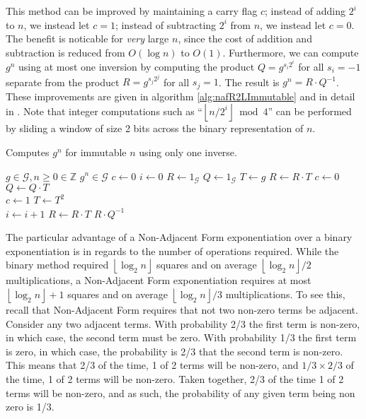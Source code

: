 \documentclass{ucalgthes1}
\theoremstyle{plain}
\theoremstyle{definition}
\newcommand{\ZZ}{\mathbb{Z}}
\newcommand{\floor}[1]{\left\lfloor #1 \right\rfloor}
\begin{document}
This method can be improved by maintaining a carry flag $c$; instead of adding $2^i$ to $n$, we instead let $c = 1$; instead of subtracting $2^i$ from $n$, we instead let $c = 0$.  The benefit is noticable for \emph{very} large $n$, since the cost of addition and subtraction is reduced from $O(\log n)$ to $O(1)$.  Furthermore, we can compute $g^n$ using at most one inversion by computing the product $Q = g^{s_i2^i}$ for all $s_i = -1$ separate from the product $R = g^{s_j2^j}$ for all $s_j = 1$.  The result is $g^n = R \cdot Q^{-1}$.  These improvements are given in algorithm \ref{alg:nafR2LImmutable} and in detail in \cite[p.4]{Joye2000}.  Note that integer computations such as ``$\floor{n/2^i} \bmod 4$'' can be performed by sliding a window of size 2 bits across the binary representation of $n$.

\bigbreak
\begin{algorithm}[h]
\caption{Computes $g^n$ for immutable $n$ using only one inverse.}\label{alg:nafR2LImmutable}
\begin{algorithmic}[1]
\REQUIRE $g \in \mathcal G, n \ge 0 \in \ZZ$
\ENSURE $g^n \in \mathcal G$
\STATE $c \gets 0$ 
\STATE $i \gets 0$
\STATE $R \gets 1_{\mathcal G}$ 
\STATE $Q \gets 1_{\mathcal G}$ 
\STATE $T \gets g$ 
	\IF {$\floor{n/2^i}+c \equiv 1 \pmod 4$}
		\STATE $R \gets R \cdot T$
		\STATE $c \gets 0$
	\ELSIF {$\floor{n/2^i}+c \equiv 3 \pmod 4$}
		\STATE $Q \gets Q \cdot T$ \\
		\STATE $c \gets 1$
	\ENDIF
	\STATE $T \gets T^2$ \\
	\STATE $i \gets i+1$
\ENDWHILE
{} \STATE $R \gets R \cdot T$ \ENDIF
\RETURN $R \cdot Q^{-1}$
\end{algorithmic}
\end{algorithm}

The particular advantage of a Non-Adjacent Form exponentiation over a binary exponentiation is in regards to the number of operations required.  While the binary method required $\floor{\log_2 n}$ squares and on average $\floor{\log_2 n}/2$ multiplications, a Non-Adjacent Form exponentiation requires at most $\floor{\log_2 n}+1$ squares and on average $\floor{\log_2 n}/3$ multiplications.  To see this, recall that Non-Adjacent Form requires that not two non-zero terms be adjacent.  Consider any two adjacent terms.  With probability 2/3 the first term is non-zero, in which case, the second term must be zero.  With probability 1/3 the first term is zero, in which case, the probability is 2/3 that the second term is non-zero.  This means that 2/3 of the time, 1 of 2 terms will be non-zero, and $1/3 \times 2/3$ of the time, 1 of 2 terms will be non-zero.  Taken together, 2/3 of the time 1 of 2 terms will be non-zero, and as such, the probability of any given term being non zero is 1/3.
\end{document}
